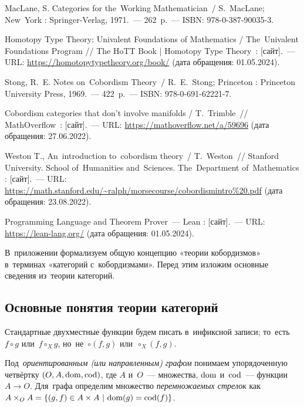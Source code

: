 \documentclass[a4paper,oneside]{article}
\begin{document}
\begin{thebibliography}{}
 MacLane, S. Categories for the~Working Mathematician~/ S.~MacLane; New~York : Springer-Verlag, 1971.~— 262~p.~— ISBN: 978-0-387-90035-3.

 Homotopy Type Theory: Univalent Foundations of Mathematics / The~{Uni\-va\-lent} Foundations Program //
The HoTT Book | Homotopy Type {The\-o\-ry}~: [сайт].~— URL: \url{https://homotopytypetheory.org/book/} (дата обращения: 01.05.2024).

 Stong, R.~E. Notes on~Cobordism Theory~/ R.~E.~Stong; Princeton : Princeton University Press, 1969.~— 422~p.~— ISBN: 978-0-691-62221-7.

 Cobordism categories that don’t involve manifolds / T.~Trimble~//
{Math\-Over\-flow}~: [сайт].~— URL: \url{https://mathoverflow.net/a/59696} (дата обращения: 27.06.2022).

 Weston T., An~introduction to~cobordism theory~/ T.~Weston~//
{Stan\-ford} University. School of~Humanities and~Sciences.
The~Department of~{Math\-e\-mat\-ics} : [сайт].~— URL: \url{https://math.stanford.edu/~ralph/morsecourse/cobordismintro%20.pdf} (дата обращения: 23.08.2022).

 Programming Language and Theorem Prover~— Lean : [сайт].~— URL: \url{https://lean-lang.org/} (дата обращения: 01.05.2024).
\end{thebibliography}

\label{TheEnd}
\pagebreak

\renewcommand*{\theHsection}{appendix.\arabic{section}}

\renewcommand{\thesection}{\Alph{section}}
\setcounter{section}{1}
\setcounter{subsection}{0}

В~приложении формализуем общую концепцию «теории кобордизмов» в~терминах «категорий с~кобордизмами».
Перед этим изложим основные сведения из~теории категорий.

\subsection{Основные понятия теории категорий}
Стандартные двухместные функции будем писать в~инфиксной записи; то~есть $f \circ g$ или~$f \circ_X g$, но~не~$\circ(f, g)$ или~$\circ_X(f, g)$.

Под~\textit{ориентированным (или направленным) графом} \cite{MacLane71} понимаем упорядоченную четвёртку $(O,\allowbreak A,\allowbreak \mathrm{dom},\allowbreak \mathrm{cod})$,
где $A$ и~$O$~— множества, $\mathrm{dom}$ и~$\mathrm{cod}$~— функции $A \rightarrow O$.
Для~графа определим множество \textit{перемножаемых стрелок} как $A \times_O A = \{ (g, f) \in A \times A \ |\ \dom(g) = \cod(f) \}$.
\end{document}
